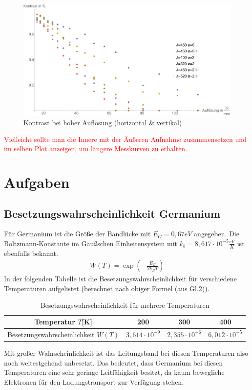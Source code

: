 \begin{figure}[H]
\centering
\includegraphics[width=1.0\linewidth]{IMAGE/Versuch2Plot2_all.pdf}
	\caption{Kontrast bei hoher Auflösung (horizontal \& vertikal)}
	\label{fig:Versuch2_Plot2_all}
\end{figure}

\textcolor{red}{Vielleicht sollte man die Innere mit der Äußeren Aufnahme zusammensetzen und im selben Plot anzeigen, um längere Messkurven zu erhalten.}


\section{Aufgaben}
\subsection{Besetzungswahrscheinlichkeit Germanium}
Für Germanium ist die Größe der Bandlücke mit \(E_G=0,67\si{eV}\) angegeben. Die Boltzmann-Konstante im Gaußschen Einheitensystem mit \(k_b=8,617\cdot 10^{-5}\si{\frac{eV}{K}}\) ist ebenfalls bekannt. 
\begin{align*}
W(T) = \exp\left(-\frac{E_G}{2 k_B T}\right)
\end{align*}
In der folgenden Tabelle ist die Besetzungswahrscheinlichkeit für verschiedene Temperaturen aufgelistet (berechnet nach obiger Formel (aus Gl.2)).

\begin{table}[H]
\centering
\caption{Besetzungswahrscheinlichkeit für mehrere Temperaturen}
\label{tab:1_1_1}
\begin{tabular}{|c|c|c|c|} \hline
Temperatur \(T\)[K] & 200 & 300 & 400 \\ \hline
Besetzungswahrscheinlichkeit \(W(T)\) &  \(3,614\cdot 10^{-9}\) & \(2,355\cdot 10^{-6}\) & \(6,012\cdot 10^{-5}\) \\ \hline
\end{tabular}
\end{table}
Mit großer Wahrscheinlichkeit ist das Leitungsband bei diesen Temperaturen also noch weitestgehend unbesetzt. Das bedeutet, dass Germanium bei diesen Temperaturen eine sehr geringe Leitfähigkeit besitzt, da kaum bewegliche Elektronen für den Ladungstransport zur Verfügung stehen.

